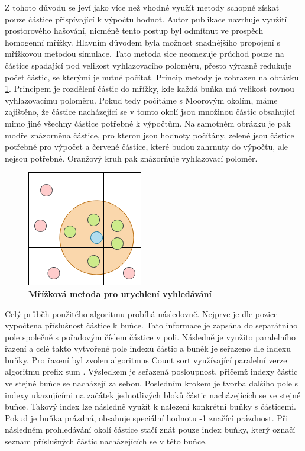 Z tohoto důvodu se jeví jako více než vhodné využít metody schopné získat pouze částice přispívající k výpočtu hodnot. Autor publikace \cite{KelagerSPH} navrhuje využití prostorového hašování, nicméně tento postup byl odmítnut ve prospěch homogenní mřížky. Hlavním důvodem byla možnost snadnějšího propojení s mřížkovou metodou simulace. Tato metoda sice neomezuje průchod pouze na částice spadající pod velikost vyhlazovacího poloměru, přesto výrazně redukuje počet částic, se kterými je nutné počítat. Princip metody je zobrazen na obrázku \ref{fig:GridSPH}. Principem je rozdělení částic do mřížky, kde každá buňka má velikost rovnou vyhlazovacímu poloměru. Pokud tedy počítáme s Moorovým okolím, máme zajištěno, že částice nacházející se v tomto okolí jsou množinou částic obsahující mimo jiné všechny částice potřebné k výpočtům. Na samotném obrázku je pak modře znázorněna částice, pro kterou jsou hodnoty počítány, zelené jsou částice potřebné pro výpočet a červené částice, které budou zahrnuty do výpočtu, ale nejsou potřebné. Oranžový kruh pak znázorňuje vyhlazovací poloměr.

\begin{figure}[hbt]
	\centering
	\captionsetup{justification=centering}
	\includegraphics[scale=0.6]{obrazky-figures/GridSPH.png}
	\caption{\textbf{Mřížková metoda pro urychlení vyhledávání}}
	\label{fig:GridSPH}
\end{figure}

Celý průběh použitého algoritmu probíhá následovně. Nejprve je dle pozice vypočtena příslušnost částice k buňce. Tato informace je zapsána do separátního pole společně s pořadovým číslem částice v poli. Následně je využito paralelního řazení a celé takto vytvořené pole indexů částic a buněk je seřazeno dle indexu buňky. Pro řazení byl zvolen algoritmus Count sort \cite{CountSortGPU} využívající paralelní verze algoritmu prefix sum \cite{GPUGemsPrefixSum}. Výsledkem je seřazená posloupnost, přičemž indexy částic ve stejné buňce se nacházejí za sebou. Posledním krokem je tvorba dalšího pole s indexy ukazujícími na začátek jednotlivých bloků částic nacházejících se ve stejné buňce. Takový index lze následně využít k nalezení konkrétní buňky s částicemi. Pokud je buňka prázdná, obsahuje speciální hodnotu -1 značící prázdnost. Při následném prohledávání okolí částice stačí znát pouze index buňky, který označí seznam příslušných částic nacházejících se v této buňce.

